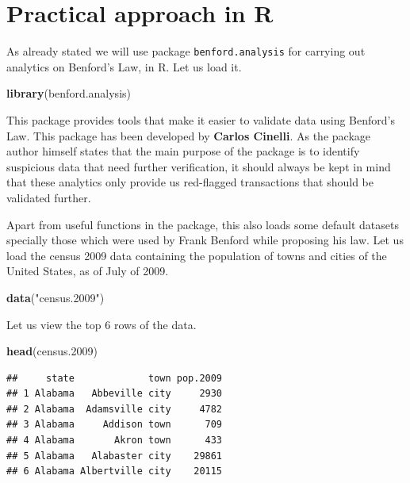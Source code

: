\documentclass[
]{book}
\newenvironment{Shaded}{\begin{snugshade}}{\end{snugshade}}
\newcommand{\FloatTok}[1]{\textcolor[rgb]{0.00,0.00,0.81}{#1}}
\newcommand{\FunctionTok}[1]{\textcolor[rgb]{0.13,0.29,0.53}{\textbf{#1}}}
\newcommand{\NormalTok}[1]{#1}
\newcommand{\StringTok}[1]{\textcolor[rgb]{0.31,0.60,0.02}{#1}}
\begin{document}
\hypertarget{pracben}{%
\section{Practical approach in R}\label{pracben}}

As already stated we will use package \texttt{benford.analysis} for carrying out analytics on Benford's Law, in R. Let us load it.

\begin{Shaded}
\begin{Highlighting}[]
\FunctionTok{library}\NormalTok{(benford.analysis)}
\end{Highlighting}
\end{Shaded}

This package provides tools that make it easier to validate data using Benford's Law. This package has been developed by \textbf{Carlos Cinelli}. As the package author himself states that the main purpose of the package is to identify suspicious data that need further verification, it should always be kept in mind that these analytics only provide us red-flagged transactions that should be validated further.

Apart from useful functions in the package, this also loads some default datasets specially those which were used by Frank Benford while proposing his law. Let us load the census 2009 data containing the population of towns and cities of the United States, as of July of 2009.

\begin{Shaded}
\begin{Highlighting}[]
\FunctionTok{data}\NormalTok{(}\StringTok{"census.2009"}\NormalTok{)}
\end{Highlighting}
\end{Shaded}

Let us view the top 6 rows of the data.

\begin{Shaded}
\begin{Highlighting}[]
\FunctionTok{head}\NormalTok{(census}\FloatTok{.2009}\NormalTok{)}
\end{Highlighting}
\end{Shaded}

\begin{verbatim}
##     state             town pop.2009
## 1 Alabama   Abbeville city     2930
## 2 Alabama  Adamsville city     4782
## 3 Alabama     Addison town      709
## 4 Alabama       Akron town      433
## 5 Alabama   Alabaster city    29861
## 6 Alabama Albertville city    20115
\end{verbatim}
\end{document}
